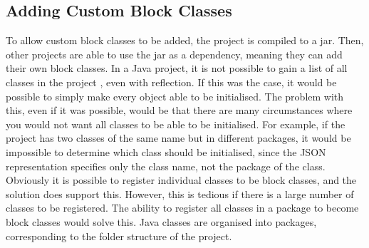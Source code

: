 \subsection{Adding Custom Block Classes}
To allow custom block classes to be added, the project is compiled to a jar. Then, other projects are able to use the jar as a dependency, meaning they can add their own block classes. In a Java project, it is not possible to gain a list of all classes in the project \cite{java_classes_in_package}, even with reflection. If this was the case, it would be possible to simply make every object able to be initialised. The problem with this, even if it was possible, would be that there are many circumstances where you would not want all classes to be able to be initialised. For example, if the project has two classes of the same name but in different packages, it would be impossible to determine which class should be initialised, since the JSON representation specifies only the class name, not the package of the class. Obviously it is possible to register individual classes to be block classes, and the solution does support this. However, this is tedious if there is a large number of classes to be registered. The ability to register all classes in a package to become block classes would solve this. Java classes are organised into packages, corresponding to the folder structure of the project.
